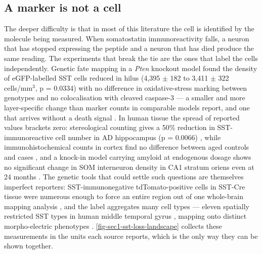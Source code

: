\documentclass[11pt]{article}
\begin{document}
\subsection{A marker is not a cell}
\label{sec-01-measurement}

The deeper difficulty is that in most of this literature the cell is identified by the molecule being measured. When somatostatin immunoreactivity falls, a neuron that has stopped expressing the peptide and a neuron that has died produce the same reading. The experiments that break the tie are the ones that label the cells independently. Genetic fate mapping in a \emph{Pten} knockout model found the density of eGFP-labelled SST cells reduced in hilus (4,395 $\pm$ 182 to 3,411 $\pm$ 322 cells/mm$^{3}$, p = 0.0334) with no difference in oxidative-stress marking between genotypes and no colocalisation with cleaved caspase-3 --- a smaller and more layer-specific change than marker counts in comparable models report, and one that arrives without a death signal \citep{Drake2024}. In human tissue the spread of reported values brackets zero: stereological counting gives a 50\% reduction in SST-immunoreactive cell number in AD hippocampus (p = 0.0066) \citep{GonzalezRodriguez2021}, while immunohistochemical counts in cortex find no difference between aged controls and cases \citep{Li1996b}, and a knock-in model carrying amyloid at endogenous dosage shows no significant change in SOM interneuron density in CA1 stratum oriens even at 24 months \citep{Sos2020}. The genetic tools that could settle such questions are themselves imperfect reporters: SST-immunonegative tdTomato-positive cells in SST-Cre tissue were numerous enough to force an entire region out of one whole-brain mapping analysis \citep{Muhsinov2026}, and the label aggregates many cell types --- eleven spatially restricted SST types in human middle temporal gyrus \citep{Hodge2019}, mapping onto distinct morpho-electric phenotypes \citep{Lee2023b}. \ref{fig-sec1-sst-loss-landscape} collects these measurements in the units each source reports, which is the only way they can be shown together.
\end{document}
